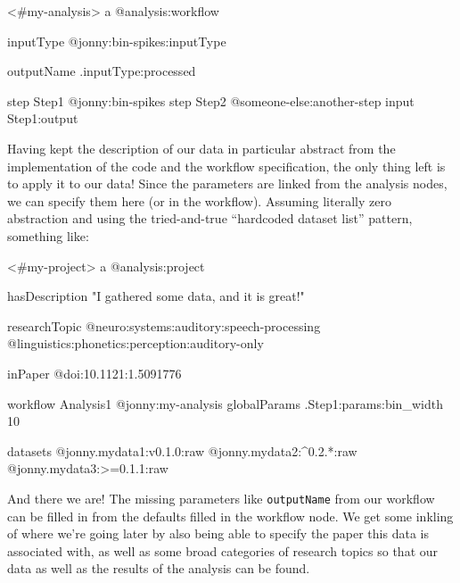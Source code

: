 \documentclass[10pt]{article}
\newenvironment{Shaded}{}{}
\newcommand{\NormalTok}[1]{#1}
\begin{document}
\begin{multicols}{2}
\begin{Shaded}
\begin{Highlighting}[]
\NormalTok{\textless{}\#my{-}analysis\textgreater{}}
\NormalTok{  a @analysis:workflow}

\NormalTok{  inputType }
\NormalTok{    @jonny:bin{-}spikes:inputType}

\NormalTok{  outputName}
\NormalTok{    .inputType:processed}

\NormalTok{  step Step1 @jonny:bin{-}spikes}
\NormalTok{  step Step2 @someone{-}else:another{-}step}
\NormalTok{    input Step1:output}
\end{Highlighting}
\end{Shaded}

Having kept the description of our data in particular abstract from the
implementation of the code and the workflow specification, the only
thing left is to apply it to our data! Since the parameters are linked
from the analysis nodes, we can specify them here (or in the workflow).
Assuming literally zero abstraction and using the tried-and-true
``hardcoded dataset list'' pattern, something like:

\begin{Shaded}
\begin{Highlighting}[]
\NormalTok{\textless{}\#my{-}project\textgreater{}}
\NormalTok{  a @analysis:project}

\NormalTok{  hasDescription}
\NormalTok{    "I gathered some data, and it is great!"}

\NormalTok{  researchTopic}
\NormalTok{    @neuro:systems:auditory:speech{-}processing}
\NormalTok{    @linguistics:phonetics:perception:auditory{-}only}

\NormalTok{  inPaper}
\NormalTok{    @doi:10.1121:1.5091776 }

\NormalTok{  workflow Analysis1 @jonny:my{-}analysis}
\NormalTok{    globalParams}
\NormalTok{      .Step1:params:bin\_width 10}

\NormalTok{    datasets}
\NormalTok{      @jonny.mydata1:v0.1.0:raw}
\NormalTok{      @jonny.mydata2:\^{}0.2.*:raw}
\NormalTok{      @jonny.mydata3:\textgreater{}=0.1.1:raw}
\end{Highlighting}
\end{Shaded}

And there we are! The missing parameters like \texttt{outputName} from
our workflow can be filled in from the defaults filled in the workflow
node. We get some inkling of where we're going later by also being able
to specify the paper this data is associated with, as well as some broad
categories of research topics so that our data as well as the results of
the analysis can be found.


\end{multicols}
\end{document}
